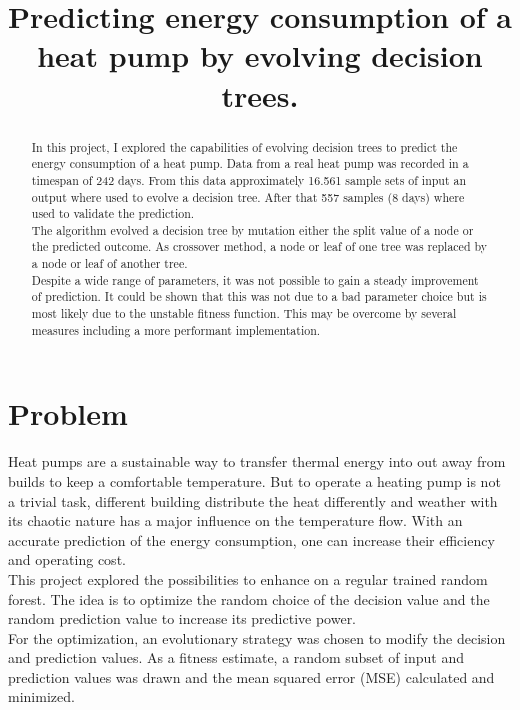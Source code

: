 \documentclass[conference]{IEEEtran}
\begin{document}
\title{Predicting energy consumption of a heat pump
by evolving decision trees.}

\author{
}

\maketitle


\begin{abstract}
In this project, I explored the capabilities of evolving decision trees to predict the energy consumption of a heat pump. Data from a real heat pump was recorded in a timespan of 242 days. From this data approximately 16.561 sample sets of input an output where used to evolve a decision tree. After that 557 samples (8 days) where used to validate the prediction.\\
The algorithm evolved a decision tree by mutation either the split value of a node or the predicted outcome. As crossover method, a node or leaf of one tree was replaced by a node or leaf of another tree.\\
Despite a wide range of parameters, it was not possible to gain a steady improvement of prediction. It could be shown that this was not due to a bad parameter choice but is most likely due to the unstable fitness function. This may be overcome by several measures including a more performant implementation.
\end{abstract}
\IEEEpeerreviewmaketitle



\section{Problem}

Heat pumps are a sustainable way to transfer thermal energy into out away from builds to keep a comfortable temperature. But to operate a heating pump is not a trivial task, different building distribute the heat differently and weather with its chaotic nature has a major influence on the temperature flow. With an accurate prediction of the energy consumption, one can increase their efficiency and operating cost.\\
This project explored the possibilities to enhance on a regular trained random forest. The idea is to optimize the random choice of the decision value and the random prediction value to increase its predictive power.\\
For the optimization, an evolutionary strategy was chosen to modify the decision and prediction values. As a fitness estimate, a random subset of input and prediction values was drawn and the mean squared error (MSE) calculated and minimized. 
\end{document}
